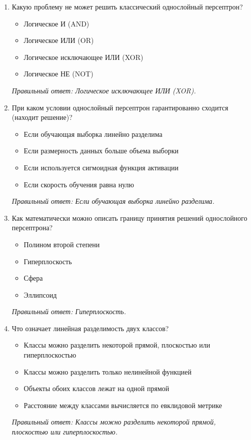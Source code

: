\begin{enumerate}[label=\textbf{\arabic*.}, leftmargin=0pt, itemsep=1.2em]
\item Какую проблему не может решить классический однослойный персептрон?
\begin{itemize}[label=$\square$, leftmargin=1.5cm, itemsep=0.2em, topsep=0.3em]
\item Логическое И (AND)
\item Логическое ИЛИ (OR)
\item Логическое исключающее ИЛИ (XOR)
\item Логическое НЕ (NOT)
\end{itemize}
{\small\textit{Правильный ответ: Логическое исключающее ИЛИ (XOR).}}

\item При каком условии однослойный персептрон гарантированно сходится (находит решение)?
\begin{itemize}[label=$\square$, leftmargin=1.5cm, itemsep=0.2em, topsep=0.3em]
\item Если обучающая выборка линейно разделима
\item Если размерность данных больше объема выборки
\item Если используется сигмоидная функция активации
\item Если скорость обучения равна нулю
\end{itemize}
{\small\textit{Правильный ответ: Если обучающая выборка линейно разделима.}}

\item Как математически можно описать границу принятия решений однослойного персептрона?
\begin{itemize}[label=$\square$, leftmargin=1.5cm, itemsep=0.2em, topsep=0.3em]
\item Полином второй степени
\item Гиперплоскость
\item Сфера
\item Эллипсоид
\end{itemize}
{\small\textit{Правильный ответ: Гиперплоскость.}}

\item Что означает линейная разделимость двух классов?
\begin{itemize}[label=$\square$, leftmargin=1.5cm, itemsep=0.2em, topsep=0.3em]
\item Классы можно разделить некоторой прямой, плоскостью или гиперплоскостью
\item Классы можно разделить только нелинейной функцией
\item Объекты обоих классов лежат на одной прямой
\item Расстояние между классами вычисляется по евклидовой метрике
\end{itemize}
{\small\textit{Правильный ответ: Классы можно разделить некоторой прямой, плоскостью или гиперплоскостью.}}


\end{enumerate}

